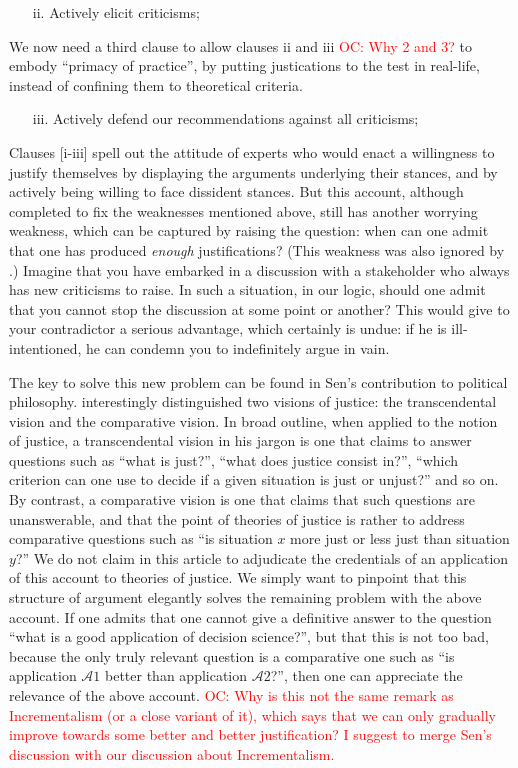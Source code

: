 \documentclass[preprint, french, english, 11pt, authoryear]{elsarticle}%
\newcommand{\commentOC}[1]{\textcolor{red}{OC: #1}}
\begin{document}
\begin{itemize}
\item[ii.]	Actively elicit criticisms;
\end{itemize}

We now need a third clause to allow clauses ii and iii \commentOC{Why 2 and 3?} to embody “primacy of practice”, by putting justications to the test in real-life, instead of confining them to theoretical criteria.

\begin{itemize}
\item[iii.]	 Actively defend our recommendations against all criticisms;
\end{itemize}

Clauses [i-iii] spell out the attitude of experts who would enact a willingness to justify themselves by displaying the arguments underlying their stances, and by actively being willing to face dissident stances. But this account, although completed to fix the weaknesses mentioned above, still has another worrying weakness, which can be captured by raising the question: when can one admit that one has produced \emph{enough} justifications? (This weakness was also ignored by  \citet{meinard_what_2017}.) Imagine that you have embarked in a discussion with a stakeholder who always has new criticisms to raise. In such a situation, in our logic, should one admit that you cannot stop the discussion at some point or another? This would give to your contradictor a serious advantage, which certainly is undue: if he is ill-intentioned, he can condemn you to indefinitely argue in vain.

The key to solve this new problem can be found in Sen's contribution to political philosophy. \cite{sen_idea_2009} interestingly distinguished two visions of justice: the transcendental vision and the comparative vision. In broad outline, when applied to the notion of justice, a transcendental vision in his jargon is one that claims to answer questions such as “what is just?”, “what does justice consist in?”, “which criterion can one use to decide if a given situation is just or unjust?” and so on. By contrast, a comparative vision is one that claims that such questions are unanswerable, and that the point of theories of justice is rather to address comparative questions such as “is situation $x$ more just or less just than situation $y$?” We do not claim in this article to adjudicate the credentials of an application of this account to theories of justice. We simply want to pinpoint that this structure of argument elegantly solves the remaining problem with the above account. If one admits that one cannot give a definitive answer to the question “what is a good application of decision science?”, but that this is not too bad, because the only truly relevant question is a comparative one such as “is application $\mathscr{A}1$ better than application $\mathscr{A}2$?”, then one can appreciate the relevance of the above account.
\commentOC{Why is this not the same remark as Incrementalism (or a close variant of it), which says that we can only gradually improve towards some better and better justification? I suggest to merge Sen’s discussion with our discussion about Incrementalism.}
\end{document}
